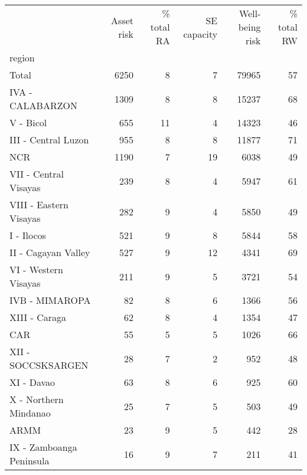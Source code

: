 \begin{tabular}{lrrrrr}
\toprule
{} &  Asset risk &  \% total RA &  SE capacity &  Well-being risk &  \% total RW \\
region                   &             &             &              &                  &             \\
\midrule
Total                    &        6250 &           8 &            7 &            79965 &          57 \\
IVA - CALABARZON         &        1309 &           8 &            8 &            15237 &          68 \\
V - Bicol                &         655 &          11 &            4 &            14323 &          46 \\
III - Central Luzon      &         955 &           8 &            8 &            11877 &          71 \\
NCR                      &        1190 &           7 &           19 &             6038 &          49 \\
VII - Central Visayas    &         239 &           8 &            4 &             5947 &          61 \\
VIII - Eastern Visayas   &         282 &           9 &            4 &             5850 &          49 \\
I - Ilocos               &         521 &           9 &            8 &             5844 &          58 \\
II - Cagayan Valley      &         527 &           9 &           12 &             4341 &          69 \\
VI - Western Visayas     &         211 &           9 &            5 &             3721 &          54 \\
IVB - MIMAROPA           &          82 &           8 &            6 &             1366 &          56 \\
XIII - Caraga            &          62 &           8 &            4 &             1354 &          47 \\
CAR                      &          55 &           5 &            5 &             1026 &          66 \\
XII - SOCCSKSARGEN       &          28 &           7 &            2 &              952 &          48 \\
XI - Davao               &          63 &           8 &            6 &              925 &          60 \\
X - Northern Mindanao    &          25 &           7 &            5 &              503 &          49 \\
ARMM                     &          23 &           9 &            5 &              442 &          28 \\
IX - Zamboanga Peninsula &          16 &           9 &            7 &              211 &          41 \\
\bottomrule
\end{tabular}

